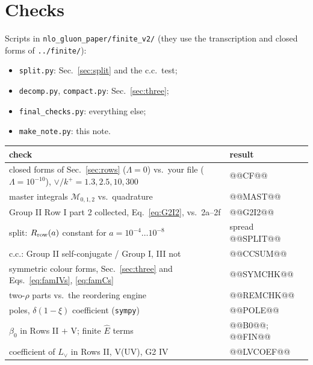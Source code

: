 \documentclass[10pt]{article}
\numberwithin{equation}{section}
\newcommand{\Lv}{L_{\vee}}
\newcommand{\Eh}{\hat E}
\begin{document}
\section{Checks}\label{sec:checks}
Scripts in \texttt{nlo\_gluon\_paper/finite\_v2/} (they use the transcription and closed forms of \texttt{../finite/}):
\begin{itemize}
\item \texttt{split.py}: Sec.~\ref{sec:split} and the c.c.\ test;
\item \texttt{decomp.py}, \texttt{compact.py}: Sec.~\ref{sec:three};
\item \texttt{final\_checks.py}: everything else;
\item \texttt{make\_note.py}: this note.
\end{itemize}
\begin{table}[H]\centering\small
\begin{tabular}{@{}p{}p{}@{}}\toprule
check & result\\\midrule
closed forms of Sec.~\ref{sec:rows} ($\Lambda=0$) vs.\ your file ($\Lambda=10^{-10}$), $\vee/k^+=1.3,2.5,10,300$ & @@CF@@\\
master integrals $\mathcal M_{0,1,2}$ vs.\ quadrature & @@MAST@@\\
Group II Row I part 2 collected, Eq.~\eqref{eq:G2I2}, vs.\ 2a--2f & @@G2I2@@\\
split: $R_{\rm row}(a)$ constant for $a=10^{-4}\dots10^{-8}$ & spread @@SPLIT@@\\
c.c.: Group II self-conjugate / Group I, III not & @@CCSUM@@\\
symmetric colour forms, Sec.~\ref{sec:three} and Eqs.~\eqref{eq:famIVs}, \eqref{eq:famCs} & @@SYMCHK@@\\
two-$\rho$ parts vs.\ the reordering engine & @@REMCHK@@\\
poles, $\delta(1-\xi)$ coefficient (\texttt{sympy}) & @@POLE@@\\
$\beta_0$ in Rows II $+$ V; finite $\Eh$ terms & @@B0@@; @@FIN@@\\
coefficient of $\Lv$ in Rows II, V(UV), G2 IV & @@LVCOEF@@\\\bottomrule
\end{tabular}
\end{table}
\end{document}
